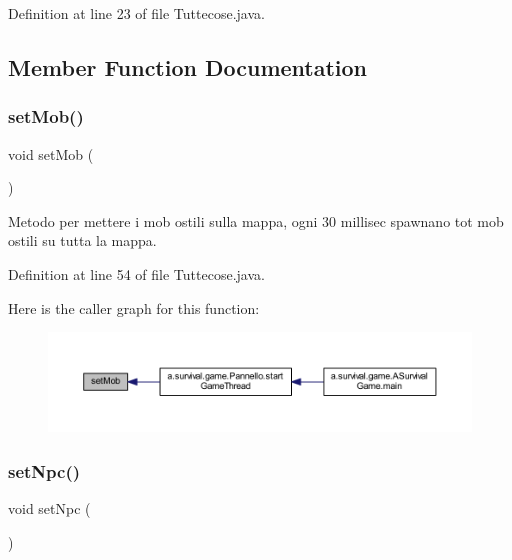 Definition at line 23 of file Tuttecose.\+java.



\subsection{Member Function Documentation}
\mbox{\label{classa_1_1survival_1_1game_1_1_tuttecose_ab2ada56f46e12f2fe9e2ec9b9dcf24b2}} 
\subsubsection{\texorpdfstring{set\+Mob()}{setMob()}}
{\footnotesize\ttfamily void set\+Mob (\begin{DoxyParamCaption}{ }\end{DoxyParamCaption})}



Metodo per mettere i mob ostili sulla mappa, ogni 30 millisec spawnano tot mob ostili su tutta la mappa. 



Definition at line 54 of file Tuttecose.\+java.

Here is the caller graph for this function\+:
\nopagebreak
\begin{figure}[H]
\begin{center}
\leavevmode
\includegraphics[width=350pt]{classa_1_1survival_1_1game_1_1_tuttecose_ab2ada56f46e12f2fe9e2ec9b9dcf24b2_icgraph}
\end{center}
\end{figure}
\mbox{\label{classa_1_1survival_1_1game_1_1_tuttecose_a80676eb19cc9cd7bacacb02ac21c11c7}} 
\subsubsection{\texorpdfstring{set\+Npc()}{setNpc()}}
{\footnotesize\ttfamily void set\+Npc (\begin{DoxyParamCaption}{ }\end{DoxyParamCaption})}



